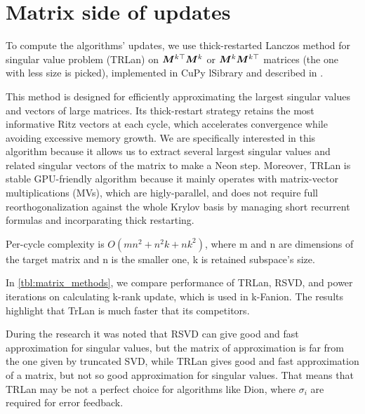 \documentclass{article} %
\begin{document}
\section{Matrix side of updates}
To compute the algorithms' updates, we use thick-restarted Lanczos method for singular value problem (TRLan) on ${\bm{M}}^{k\top}{\bm{M}}^k$ or ${\bm{M}}^k {\bm{M}}^{k\top}$ matrices (the one with less size is picked), implemented in CuPy lSibrary \citep{cupy_svds_ref} and described in \citet{simonz1998thick}.

This method is designed for efficiently approximating the largest singular values and vectors of large matrices. Its thick-restart strategy retains the most informative Ritz vectors at each cycle, which accelerates convergence while avoiding excessive memory growth. We are specifically interested in this algorithm because it allows us to extract several largest singular values and related singular vectors of the matrix to make a Neon step. Moreover, TRLan is stable GPU-friendly algorithm because it mainly operates with matrix-vector multiplications (MVs), which are higly-parallel, and does not require full reorthogonalization against the whole Krylov basis by managing  short recurrent formulas and incorparating thick restarting. 

Per-cycle complexity is $O(mn^2 + n^2k + nk^2)$, where m and n are dimensions of the target matrix and n is the smaller one, k is retained subspace's size.

In \cref{tbl:matrix_methods}, we compare performance of TRLan, RSVD, and power iterations on calculating k-rank update, which is used in k-Fanion. The results highlight that TrLan is much faster that its competitors.

During the research it was noted that RSVD can give good and fast approximation for singular values, but the matrix of approximation is far from the one given by truncated SVD, while TRLan gives good and fast approximation of a matrix, but not so good approximation for singular values. That means that TRLan may be not a perfect choice for algorithms like Dion, where $\sigma_i$ are required for error feedback.
\end{document}
